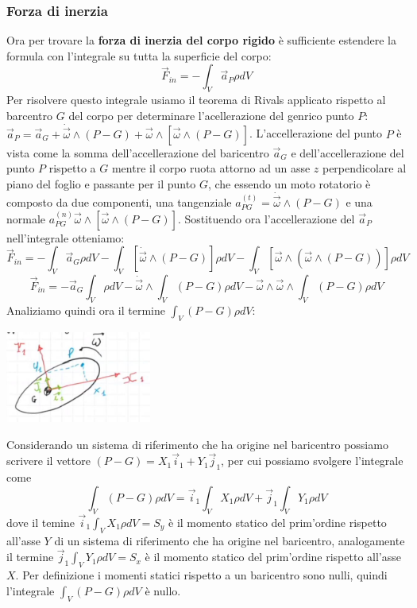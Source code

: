 \subsubsection*{Forza di inerzia}
Ora per trovare la \textbf{forza di inerzia del corpo rigido} è sufficiente estendere la formula con l'integrale su tutta la superficie del corpo:
\[
    \vec{F}_{in} = - \int_V \vec{a}_P \rho dV
\]
Per risolvere questo integrale usiamo il teorema di Rivals applicato rispetto al barcentro $G$ del corpo per determinare l'acellerazione del genrico punto $P$: $\vec{a}_P = \vec{a}_G + \dot{\vec{\omega}}\land(P-G) + \vec{\omega}\land [\vec{\omega}\land (P-G)]$.\newline
L'accellerazione del punto $P$ è vista come la somma dell'accellerazione del baricentro  $\vec{a}_G$  e  dell'accellerazione del punto $P$ rispetto a $G$ mentre il corpo ruota attorno ad un asse $z$ perpendicolare al piano del foglio e passante per il punto $G$, che essendo un moto rotatorio è composto da due componenti, una tangenziale $a_{PG}^{(t)} = \dot{\vec{\omega}}\land(P-G)$ e una normale $a_{PG}^{(n)}\vec{\omega}\land [\vec{\omega}\land (P-G)]$.\newline
Sostituendo ora l'accellerazione del $\vec{a}_P$ nell'integrale otteniamo:
\[
    \vec{F}_{in} = - \int_V \vec{a}_G \rho dV - \int_V \left[ \dot{\vec{\omega}} \land (P-G) \right] \rho dV - \int_V \left[ \vec{\omega} \land (\vec{\omega} \land (P-G)) \right] \rho dV
\]
\[
    \vec{F}_{in} = - \vec{a}_G \int_V \rho d V - \dot{\vec{\omega}} \land \int_V (P-G) \rho dV - \vec{\omega} \land \vec{\omega} \land \int_V (P-G) \rho dV
\]
Analiziamo quindi ora il termine $\int_V (P-G) \rho dV$:
\begin{center}
    \includegraphics[height=3cm]{../lezione9/img2.JPG}
\end{center}
Considerando un sistema di riferimento che ha origine nel baricentro possiamo scrivere il vettore $(P-G) = X_1 \vec{i}_1 + Y_1 \vec{j}_1$, per cui possiamo svolgere l'integrale come
\[
    \int_V (P-G) \rho dV = \vec{i}_1 \int_V X_1 \rho dV + \vec{j}_1 \int_V Y_1 \rho dV
\]
dove il temine $\vec{i}_1 \int_V X_1 \rho dV = S_y$ è il momento statico del prim'ordine rispetto all'asse $Y$ di un sistema di riferimento che ha origine nel baricentro, analogamente il termine $\vec{j}_1 \int_V Y_1 \rho dV = S_x$ è il momento statico del prim'ordine rispetto all'asse $X$. Per definizione i momenti statici rispetto a un baricentro sono nulli, quindi l'integrale $\int_V (P-G) \rho dV$ è nullo.\newline
